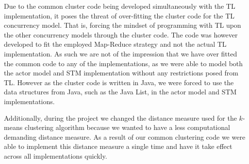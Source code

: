 
Due to the common cluster code being developed simultaneously with the \ac{TL} implementation, it poses the threat of over-fitting the cluster code for the \ac{TL} concurrency model. That is, forcing the mindset of programming with \ac{TL} upon the other concurrency models through the cluster code. The code was however developed to fit the employed Map-Reduce strategy and not the actual \ac{TL} implementation. As such we are not of the impression that we have over fitted the common code to any of the implementations, as we were able to model both the actor model and \ac{STM} implementation without any restrictions posed from \ac{TL}. However as the cluster code is written in Java, we were forced to use the data structures from Java, such as the Java List, in the actor model and \ac{STM} implementations.

Additionally, during the project we changed the distance measure used for the $k$-means clustering algorithm because we wanted to have a less computational demanding distance measure. As a result of our common clustering code we were able to implement this distance measure a single time and have it take effect across all implementations quickly.


\worksheetend